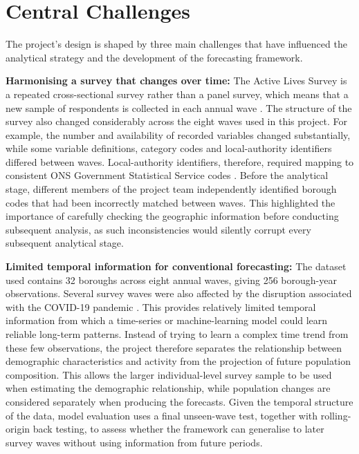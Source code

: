 \documentclass[ %
                    author={Ashrey Ashrey, Sanya Kapoor, Trisha Sharma, Yash Bhooshan Pandloskar},
                supervisor={Dr. Dalila O’Grady},
                    degree={MSc},
                     title={Using machine learning to forecast physical activity participation, volunteering and activity patterns in London},
                  subtitle={},
                      type={},
                      year={2021}]{dissertation}
\begin{document}
\section{Central Challenges}

The project's design is shaped by three main challenges that have influenced the analytical strategy and the development of the forecasting framework.

\textbf{Harmonising a survey that changes over time:}
The Active Lives Survey is a repeated cross-sectional survey rather than a panel survey, which means that a new sample of respondents is collected in each annual wave \cite{sport_england_active_lives}. The structure of the survey also changed considerably across the eight waves used in this project. For example, the number and availability of recorded variables changed substantially, while some variable definitions, category codes and local-authority identifiers differed between waves. Local-authority identifiers, therefore, required mapping to consistent ONS Government Statistical Service codes \cite{ons_gss_geography}. Before the analytical stage, different members of the project team independently identified borough codes that had been incorrectly matched between waves. This highlighted the importance of carefully checking the geographic information before conducting subsequent analysis, as such inconsistencies would silently corrupt every subsequent analytical stage.

\textbf{Limited temporal information for conventional forecasting:}
The dataset used contains 32 boroughs across eight annual waves, giving 256 borough-year observations. Several survey waves were also affected by the disruption associated with the COVID-19 pandemic \cite{sport_england_active_lives}. This provides relatively limited temporal information from which a time-series or machine-learning model could learn reliable long-term patterns. Instead of trying to learn a complex time trend from these few observations, the project therefore separates the relationship between demographic characteristics and activity from the projection of future population composition. This allows the larger individual-level survey sample to be used when estimating the demographic relationship, while population changes are considered separately when producing the forecasts. Given the temporal structure of the data, model evaluation uses a final unseen-wave test, together with rolling-origin back testing, to assess whether the framework can generalise to later survey waves without using information from future periods.
\end{document}
